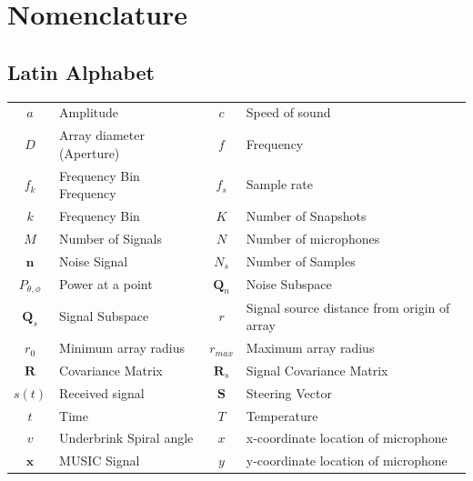 \documentclass{UoNMCHA}
\numberwithin{equation}{section}
\begin{document}
\singlespacing
\newpage
\tableofcontents
\newpage
\listoftables
\listoffigures
\newpage
\section*{Nomenclature}
\subsection*{Latin Alphabet}
    \begin{table}[H]
        \begin{tabular}{clcl}
            $a$&Amplitude&$c$&Speed of sound\\
            $D$&Array diameter (Aperture)&$f$&Frequency\\
            $f_k$&Frequency Bin Frequency&$f_s$&Sample rate\\
            $k$&Frequency Bin&$K$&Number of Snapshots\\
            $M$&Number of Signals&$N$&Number of microphones\\
            $\mathbf{n}$&Noise Signal&$N_s$&Number of Samples\\
            $P_{\theta,\phi}$&Power at a point&$\mathbf{Q}_n$&Noise Subspace\\
            $\mathbf{Q}_s$&Signal Subspace&$r$&Signal source distance from origin of array\\
            $r_0$&Minimum array radius&$r_{max}$&Maximum array radius\\
            $\mathbf{R}$&Covariance Matrix&$\mathbf{R}_s$&Signal Covariance Matrix\\
            $s(t)$&Received signal&$\mathbf{S}$&Steering Vector\\
            $t$&Time&$T$&Temperature\\
            $v$&Underbrink Spiral angle&$x$&x-coordinate location of microphone\\
            $\mathbf{x}$&MUSIC Signal&$y$&y-coordinate location of microphone
        \end{tabular}
    \end{table}
\end{document}
